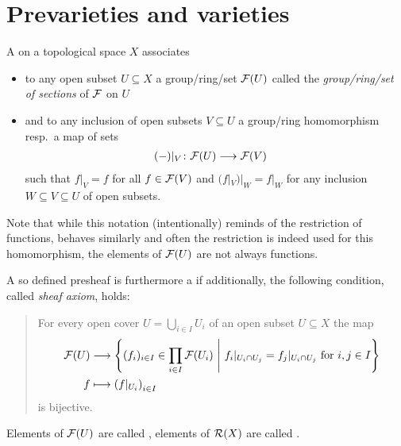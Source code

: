 \documentclass[a4paper,parskip=half,numbers=enddot, DIV=12]{scrreprt}
\begin{document}
\section{Prevarieties and varieties}
\begin{defi}
    A  on a topological space $X$ associates 
    \begin{itemize}
    	\item to any open subset $U\subseteq X$ a group/ring/set $\mathcal{F}(U)$ called the \emph{group/ring/set of sections} of $\mathcal{F}$ on $U$
    	\item and to any inclusion of open subsets $V\subseteq U$ a group/ring homomorphism resp.\ a map of sets
    	\begin{align*}
	    	(-)|_V\colon \mathcal{F}(U) &\longrightarrow \mathcal{F}(V)
    	\end{align*}
    	such that $f|_V = f$ for all $f\in\mathcal{F}(V)$ and $(f|_V)|_W = f|_W$ for any inclusion $W\subseteq V\subseteq U$ of open subsets.
    \end{itemize}  Note that while this notation (intentionally) reminds of the restriction of functions, behaves similarly and often the restriction is indeed used for this homomorphism, the elements of $\mathcal{F}(U)$ are not always functions. 
    
    A so defined presheaf is furthermore a  if additionally, the following condition, called \emph{sheaf axiom}, holds:
    \begin{quote}
     For every open cover $U = \bigcup_{i\in I} U_i$ of an open subset $U\subseteq X$ the map
        \begin{align*}
			\mathcal{F}(U) &\longrightarrow \left\{(f_i)_{i\in I}\in \prod_{i\in I} \mathcal{F} (U_i)\ \middle|\  f_i|_{U_i\cap U_j} = f_j|_{U_i\cap U_j} \text{ for }i,j\in I\right\}\\
			f &\longmapsto \left(f|_{U_i}\right)_{i\in I}
        \end{align*}
        is bijective. 
    \end{quote}
    Elements of $\mathcal{F}(U)$ are called , elements of $\mathcal{R}(X)$ are called .
\end{defi}
\end{document}
